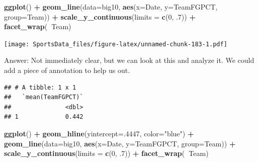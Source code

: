 \documentclass[]{book}
\newenvironment{Shaded}{\begin{snugshade}}{\end{snugshade}}
\newcommand{\DataTypeTok}[1]{\textcolor[rgb]{0.13,0.29,0.53}{#1}}
\newcommand{\DecValTok}[1]{\textcolor[rgb]{0.00,0.00,0.81}{#1}}
\newcommand{\FloatTok}[1]{\textcolor[rgb]{0.00,0.00,0.81}{#1}}
\newcommand{\KeywordTok}[1]{\textcolor[rgb]{0.13,0.29,0.53}{\textbf{#1}}}
\newcommand{\NormalTok}[1]{#1}
\newcommand{\OperatorTok}[1]{\textcolor[rgb]{0.81,0.36,0.00}{\textbf{#1}}}
\newcommand{\StringTok}[1]{\textcolor[rgb]{0.31,0.60,0.02}{#1}}
\begin{document}
\begin{Shaded}
\begin{Highlighting}[]
\KeywordTok{ggplot}\NormalTok{() }\OperatorTok{+}\StringTok{ }\KeywordTok{geom_line}\NormalTok{(}\DataTypeTok{data=}\NormalTok{big10, }\KeywordTok{aes}\NormalTok{(}\DataTypeTok{x=}\NormalTok{Date, }\DataTypeTok{y=}\NormalTok{TeamFGPCT, }\DataTypeTok{group=}\NormalTok{Team)) }\OperatorTok{+}\StringTok{ }\KeywordTok{scale_y_continuous}\NormalTok{(}\DataTypeTok{limits =} \KeywordTok{c}\NormalTok{(}\DecValTok{0}\NormalTok{, }\FloatTok{.7}\NormalTok{)) }\OperatorTok{+}\StringTok{ }\KeywordTok{facet_wrap}\NormalTok{(}\OperatorTok{~}\NormalTok{Team)}
\end{Highlighting}
\end{Shaded}

\texttt{[image: SportsData\_files/figure-latex/unnamed-chunk-183-1.pdf]}

Answer: Not immediately clear, but we can look at this and analyze it. We could add a piece of annotation to help us out.

\begin{Shaded}
\end{Shaded}

\begin{verbatim}
## # A tibble: 1 x 1
##   `mean(TeamFGPCT)`
##               <dbl>
## 1             0.442
\end{verbatim}

\begin{Shaded}
\begin{Highlighting}[]
\KeywordTok{ggplot}\NormalTok{() }\OperatorTok{+}\StringTok{ }\KeywordTok{geom_hline}\NormalTok{(}\DataTypeTok{yintercept=}\NormalTok{.}\DecValTok{4447}\NormalTok{, }\DataTypeTok{color=}\StringTok{"blue"}\NormalTok{) }\OperatorTok{+}\StringTok{ }\KeywordTok{geom_line}\NormalTok{(}\DataTypeTok{data=}\NormalTok{big10, }\KeywordTok{aes}\NormalTok{(}\DataTypeTok{x=}\NormalTok{Date, }\DataTypeTok{y=}\NormalTok{TeamFGPCT, }\DataTypeTok{group=}\NormalTok{Team)) }\OperatorTok{+}\StringTok{ }\KeywordTok{scale_y_continuous}\NormalTok{(}\DataTypeTok{limits =} \KeywordTok{c}\NormalTok{(}\DecValTok{0}\NormalTok{, }\FloatTok{.7}\NormalTok{)) }\OperatorTok{+}\StringTok{ }\KeywordTok{facet_wrap}\NormalTok{(}\OperatorTok{~}\NormalTok{Team)}
\end{Highlighting}
\end{Shaded}
\end{document}

